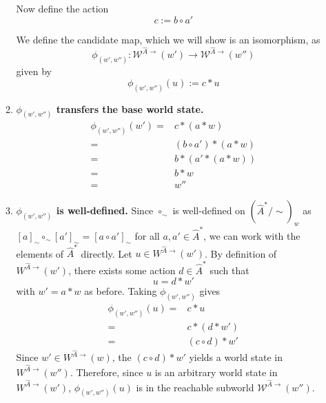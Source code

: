 \begin{proofE}
\begin{enumerate}
\begin{enumerate}
        Now define the action
        \begin{equation}
            c := b \circ a'
        \end{equation}

        We define the candidate map, which we will show is an isomorphism, as
        \begin{equation}
            \phi_{(w', w'')}: \mathscr{W}^{\hat{A}\to}(w') \to \mathscr{W}^{\hat{A}\to}(w'')
        \end{equation}
        given by
        \begin{equation}
            \phi_{(w', w'')}(u) := c \ast u
        \end{equation}

    \item \textbf{$\phi_{(w', w'')}$ transfers the base world state.}
    \begin{align}
        \phi_{(w', w'')}(w') = & c \ast (a \ast w) \\
        = & (b \circ a') \ast (a \ast w) \\
        = & b \ast (a' \ast (a \ast w)) \\
        = & b \ast w \\
        = & w''
    \end{align}

    \item \textbf{$\phi_{(w', w'')}$ is well-defined.}
    Since $\circ_{\sim}$ is well-defined on $(\hat{A}^{*}/\sim)_{w}$ as $[a]_{\sim} \circ_{\sim} [a']_{\sim} = [a \circ a']_{\sim}$ for all $a,a' \in \hat{A}^{*}$, we can work with the elements of $\hat{A}^{*}$ directly.
    Let $u \in W^{\hat{A}\to}(w')$.
    By definition of $W^{\hat{A}\to}(w')$, there exists some action $d \in \hat{A}^{*}$ such that
    \begin{equation}
        u = d \ast w'
    \end{equation}
    with $w' = a \ast w$ as before.
    Taking $\phi_{(w', w'')}$ gives
    \begin{align}
        \phi_{(w', w'')}(u) = & c \ast u \\
        = & c \ast (d \ast w') \\
        = & (c \circ d) \ast w'
    \end{align}
    Since $w' \in W^{\hat{A}\to}(w)$, the $(c \circ d) \ast w'$ yields a world state in $W^{\hat{A}\to}(w'')$.
    Therefore, since $u$ is an arbitrary world state in $W^{\hat{A}\to}(w')$, $\phi_{(w', w'')}(u)$ is in the reachable subworld $\mathscr{W}^{\hat{A}\to}(w'')$.


\end{enumerate}
\end{enumerate}
\end{proofE}
